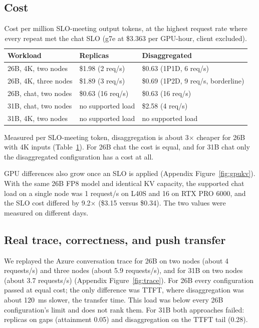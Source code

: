\documentclass[11pt]{article}
\begin{document}
\subsection{Cost}\label{sec:cost}

\begin{table}[!htbp]
\centering\small
\begin{tabular}{lll}
\toprule
Workload & Replicas & Disaggregated \\
\midrule
26B, 4K, two nodes   & \$1.98 (2 req/s) & \$0.63 (1P1D, 6 req/s) \\
26B, 4K, three nodes & \$1.89 (3 req/s) & \$0.69 (1P2D, 9 req/s, borderline) \\
26B, chat, two nodes & \$0.63 (16 req/s) & \$0.63 (16 req/s) \\
31B, chat, two nodes & no supported load & \$2.58 (4 req/s) \\
31B, 4K, two nodes   & no supported load & no supported load \\
\bottomrule
\end{tabular}
\caption{Cost per million SLO-meeting output tokens, at the highest request rate where every repeat met the chat SLO (g7e at \$3.363 per GPU-hour, client excluded).}
\label{tab:cost}
\end{table}

Measured per SLO-meeting token, disaggregation is about 3$\times$ cheaper for 26B with 4K inputs (Table~\ref{tab:cost}). For 26B chat the cost is equal, and for 31B chat only the disaggregated configuration has a cost at all.

GPU differences also grow once an SLO is applied (Appendix Figure~\ref{fig:gpukv}). With the same 26B FP8 model and identical KV capacity, the supported chat load on a single node was 1 request/s on L40S and 16 on RTX PRO 6000, and the SLO cost differed by 9.2$\times$ (\$3.15 versus \$0.34). The two values were measured on different days.

\subsection{Real trace, correctness, and push transfer}\label{sec:trace}

We replayed the Azure conversation trace for 26B on two nodes (about 4 requests/s) and three nodes (about 5.9 requests/s), and for 31B on two nodes (about 3.7 requests/s) (Appendix Figure~\ref{fig:trace}). For 26B every configuration passed at equal cost; the only difference was TTFT, where disaggregation was about 120~ms slower, the transfer time. This load was below every 26B configuration's limit and does not rank them. For 31B both approaches failed: replicas on gaps (attainment 0.05) and disaggregation on the TTFT tail (0.28).
\end{document}
